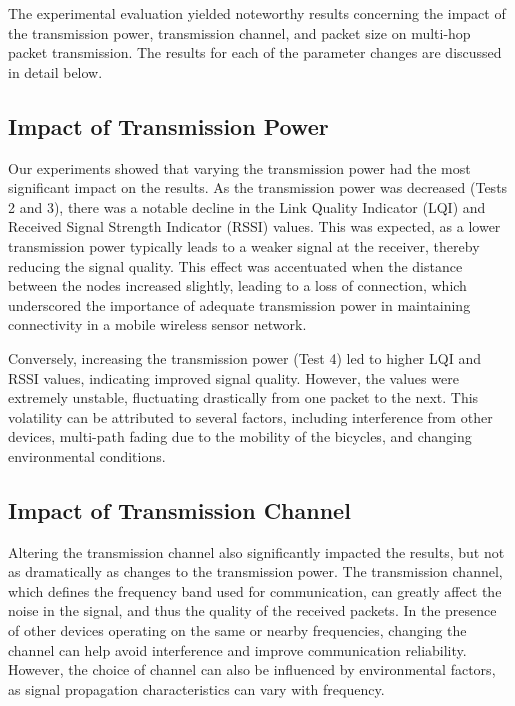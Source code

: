 \documentclass[runningheads]{llncs}
\begin{document}
\clearpage

The experimental evaluation yielded noteworthy results concerning the impact of the transmission power, transmission channel, and packet size on multi-hop packet transmission. The results for each of the parameter changes are discussed in detail below.

\subsection{Impact of Transmission Power}

Our experiments showed that varying the transmission power had the most significant impact on the results. As the transmission power was decreased (Tests 2 and 3), there was a notable decline in the Link Quality Indicator (LQI) and Received Signal Strength Indicator (RSSI) values. This was expected, as a lower transmission power typically leads to a weaker signal at the receiver, thereby reducing the signal quality. This effect was accentuated when the distance between the nodes increased slightly, leading to a loss of connection, which underscored the importance of adequate transmission power in maintaining connectivity in a mobile wireless sensor network.

Conversely, increasing the transmission power (Test 4) led to higher LQI and RSSI values, indicating improved signal quality. However, the values were extremely unstable, fluctuating drastically from one packet to the next. This volatility can be attributed to several factors, including interference from other devices, multi-path fading due to the mobility of the bicycles, and changing environmental conditions.

\subsection{Impact of Transmission Channel}

Altering the transmission channel also significantly impacted the results, but not as dramatically as changes to the transmission power. The transmission channel, which defines the frequency band used for communication, can greatly affect the noise in the signal, and thus the quality of the received packets. In the presence of other devices operating on the same or nearby frequencies, changing the channel can help avoid interference and improve communication reliability. However, the choice of channel can also be influenced by environmental factors, as signal propagation characteristics can vary with frequency.
\end{document}
